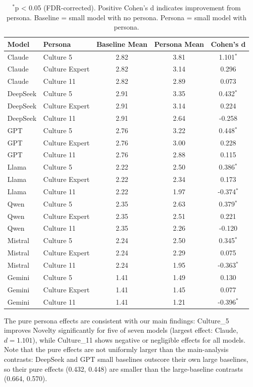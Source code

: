 \documentclass{article}
\begin{document}
\begin{table}[H]
\centering
\caption{Pure Persona Effects (Small Baseline vs. Small+Persona) for Novelty}
\label{tab:pure_persona}
\begin{tabular}{llccc}
\toprule
Model & Persona & Baseline Mean & Persona Mean & Cohen's d \\
\midrule
Claude & Culture 5 & 2.82 & 3.81 & 1.101$^*$ \\
Claude & Culture Expert & 2.82 & 3.14 & 0.296 \\
Claude & Culture 11 & 2.82 & 2.89 & 0.073 \\
DeepSeek & Culture 5 & 2.91 & 3.35 & 0.432$^*$ \\
DeepSeek & Culture Expert & 2.91 & 3.14 & 0.224 \\
DeepSeek & Culture 11 & 2.91 & 2.64 & -0.258 \\
GPT & Culture 5 & 2.76 & 3.22 & 0.448$^*$ \\
GPT & Culture Expert & 2.76 & 3.00 & 0.228 \\
GPT & Culture 11 & 2.76 & 2.88 & 0.115 \\
Llama & Culture 5 & 2.22 & 2.50 & 0.386$^*$ \\
Llama & Culture Expert & 2.22 & 2.34 & 0.173 \\
Llama & Culture 11 & 2.22 & 1.97 & -0.374$^*$ \\
Qwen & Culture 5 & 2.35 & 2.63 & 0.379$^*$ \\
Qwen & Culture Expert & 2.35 & 2.51 & 0.221 \\
Qwen & Culture 11 & 2.35 & 2.26 & -0.120 \\
Mistral & Culture 5 & 2.24 & 2.50 & 0.345$^*$ \\
Mistral & Culture Expert & 2.24 & 2.29 & 0.075 \\
Mistral & Culture 11 & 2.24 & 1.95 & -0.363$^*$ \\
Gemini & Culture 5 & 1.41 & 1.49 & 0.130 \\
Gemini & Culture Expert & 1.41 & 1.45 & 0.077 \\
Gemini & Culture 11 & 1.41 & 1.21 & -0.396$^*$ \\
\bottomrule
\end{tabular}
\caption*{\footnotesize $^*$p < 0.05 (FDR-corrected). Positive Cohen's d indicates improvement from persona. Baseline = small model with no persona. Persona = small model with persona.}
\end{table}

The pure persona effects are consistent with our main findings: 
Culture\_5 improves Novelty significantly for five of seven models (largest 
effect: Claude, \(d = 1.101\)), while Culture\_11 shows negative or negligible 
effects for all models. Note that the pure effects are not uniformly larger than 
the main-analysis contrasts: DeepSeek and GPT small baselines outscore their own 
large baselines, so their pure effects (0.432, 0.448) are smaller than the 
large-baseline contrasts (0.664, 0.570).


\printbibliography
\end{document}
